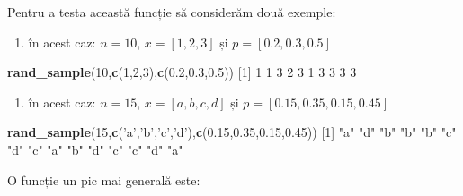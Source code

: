 \documentclass[]{article}
\newenvironment{Shaded}{\begin{snugshade}}{\end{snugshade}}
\newcommand{\DecValTok}[1]{\textcolor[rgb]{0.00,0.00,0.81}{#1}}
\newcommand{\FloatTok}[1]{\textcolor[rgb]{0.00,0.00,0.81}{#1}}
\newcommand{\KeywordTok}[1]{\textcolor[rgb]{0.13,0.29,0.53}{\textbf{#1}}}
\newcommand{\NormalTok}[1]{#1}
\newcommand{\StringTok}[1]{\textcolor[rgb]{0.31,0.60,0.02}{#1}}
\providecommand{\tightlist}{%
  \setlength{\itemsep}{0pt}\setlength{\parskip}{0pt}}
\begin{document}
Pentru a testa această funcție să considerăm două exemple:

\begin{enumerate}
\def\labelenumi{\arabic{enumi}.}
\tightlist
\item
  în acest caz: \(n=10\), \(x=[1,2,3]\) și \(p=[0.2,0.3,0.5]\)
\end{enumerate}

\begin{Shaded}
\begin{Highlighting}[]
\KeywordTok{rand_sample}\NormalTok{(}\DecValTok{10}\NormalTok{,}\KeywordTok{c}\NormalTok{(}\DecValTok{1}\NormalTok{,}\DecValTok{2}\NormalTok{,}\DecValTok{3}\NormalTok{),}\KeywordTok{c}\NormalTok{(}\FloatTok{0.2}\NormalTok{,}\FloatTok{0.3}\NormalTok{,}\FloatTok{0.5}\NormalTok{))}
\NormalTok{ [}\DecValTok{1}\NormalTok{] }\DecValTok{1} \DecValTok{1} \DecValTok{3} \DecValTok{2} \DecValTok{3} \DecValTok{1} \DecValTok{3} \DecValTok{3} \DecValTok{3} \DecValTok{3}
\end{Highlighting}
\end{Shaded}

\begin{enumerate}
\def\labelenumi{\arabic{enumi}.}
\setcounter{enumi}{1}
\tightlist
\item
  în acest caz: \(n=15\), \(x=[a,b,c,d]\) și \(p=[0.15,0.35,0.15,0.45]\)
\end{enumerate}

\begin{Shaded}
\begin{Highlighting}[]
\KeywordTok{rand_sample}\NormalTok{(}\DecValTok{15}\NormalTok{,}\KeywordTok{c}\NormalTok{(}\StringTok{'a'}\NormalTok{,}\StringTok{'b'}\NormalTok{,}\StringTok{'c'}\NormalTok{,}\StringTok{'d'}\NormalTok{),}\KeywordTok{c}\NormalTok{(}\FloatTok{0.15}\NormalTok{,}\FloatTok{0.35}\NormalTok{,}\FloatTok{0.15}\NormalTok{,}\FloatTok{0.45}\NormalTok{))}
\NormalTok{ [}\DecValTok{1}\NormalTok{] }\StringTok{"a"} \StringTok{"d"} \StringTok{"b"} \StringTok{"b"} \StringTok{"b"} \StringTok{"c"} \StringTok{"d"} \StringTok{"c"} \StringTok{"a"} \StringTok{"b"} \StringTok{"d"} \StringTok{"c"} \StringTok{"c"} \StringTok{"d"} \StringTok{"a"}
\end{Highlighting}
\end{Shaded}

O funcție un pic mai generală este:
\end{document}
